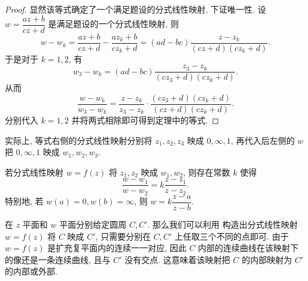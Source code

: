 \begin{proof}
  显然该等式确定了一个满足题设的分式线性映射, 下证唯一性.
  设 $w=\dfrac{az+b}{cz+d}$ 是满足题设的一个分式线性映射, 则
  \[
     w-w_k
    =\frac{az+b}{cz+d}-\frac{az_k+b}{cz_k+d}
    =(ad-bc)\frac{z-z_k}{(cz+d)(cz_k+d)}.
  \]
  于是对于 $k=1,2$, 有
  \[
    w_3-w_k
   =(ad-bc)\frac{z_3-z_k}{(cz_3+d)(cz_k+d)}.
  \]
  从而
  \[
    \frac{w-w_k}{w_3-w_k}
   =\frac{z-z_k}{z_3-z_k}\cdot\frac{(cz_3+d)(cz_k+d)}{(cz+d)(cz_k+d)}.
  \]
  分别代入 $k=1,2$ 并将两式相除即可得到定理中的等式.
\end{proof}

实际上, 等式右侧的分式线性映射分别将 $z_1,z_2,z_3$ 映成 $0,\infty,1$, 再代入后左侧的 $w$ 把 $0,\infty,1$ 映成 $w_1,w_2,w_3$.

\begin{corollary}
  若分式线性映射 $w=f(z)$ 将 $z_1,z_2$ 映成 $w_1,w_2$, 则存在常数 $k$ 使得
  \[
    \frac{w-w_1}{w-w_2}=k\frac{z-z_1}{z-z_2}.
  \]
  特别地, 若 $w(a)=0,w(b)=\infty$, 则 $w=k\dfrac{z-a}{z-b}$.
\end{corollary}

在 $z$ 平面和 $w$ 平面分别给定圆周 $C,C'$.
那么我们可以利用 构造出分式线性映射 $w=f(z)$ 将 $C$ 映成 $C'$, 只需要分别在 $C,C'$ 上任取三个不同的点即可.
由于 $w=f(z)$ 是扩充复平面内的连续一一对应, 因此 $C$ 内部的连续曲线在该映射下的像还是一条连续曲线, 且与 $C'$ 没有交点.
这意味着该映射把 $C$ 的内部映射为 $C'$ 的内部或外部.

